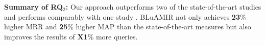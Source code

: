 \documentclass[conference]{IEEEtran}
\begin{document}
\begin{framed}
	\noindent
	\textbf{Summary of RQ$_2$:} Our approach outperforms two of the state-of-the-art studies \cite{Nguyen,Jian} and performs comparably with one study \cite{Saha}. BLuAMIR not only achieves \textbf{23}\% higher MRR and \textbf{25}\% higher MAP than the state-of-the-art measures but also improves the results of \textbf{X1}\% more queries.
\end{framed}
 

\end{document}
